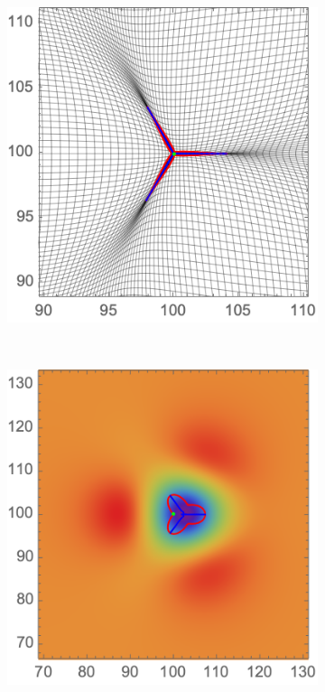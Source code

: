 \documentclass[a4paper, 11pt]{article}
\begin{document}
\begin{figure}
\begin{subfigure}[b]{0.32\textwidth}
\end{subfigure}~
\begin{subfigure}[b]{0.32\textwidth}
\includegraphics[width=\textwidth]{Elliptic_mean_Z}
\end{subfigure}\\
\begin{subfigure}[b]{0.32\textwidth}
\includegraphics[width=\textwidth]{Hyperbolic_mean_Phi}

\end{subfigure}
\end{figure}
\end{document}
